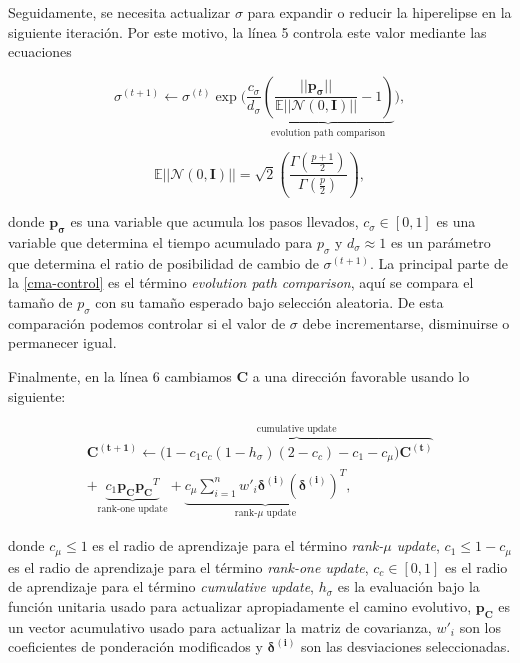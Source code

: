 Seguidamente, se necesita actualizar $\sigma$ para expandir o reducir la
hiperelipse en la siguiente iteración. Por este motivo, la línea 5 controla
este valor mediante las ecuaciones

\begin{equation}
    \sigma^{(t + 1)} \gets \sigma^{(t)} \exp\bigg(\frac{c_{\sigma}}{d_{\sigma}}
    \underbrace{\left(\frac{||\boldsymbol{p_{\sigma}}||}{\mathbb{E}||\mathcal{N}(0,
    \mathbf{I})||} - 1 \right)}_{\text{evolution path comparison}} \bigg),
\label{cma-control}
\end{equation}

\begin{equation}
\mathbb{E}||\mathcal{N}(0, \mathbf{I})|| = \sqrt{2} \left(
  \frac{\Gamma\left(\frac{p + 1}{2}\right)}{\Gamma\left({\frac{p}{2}}\right)}
  \right),
\label{cma-E}
\end{equation}

donde $\boldsymbol{p_{\sigma}}$ es una variable que acumula los pasos llevados,
$c_{\sigma} \in [0, 1]$ es una variable que determina el tiempo acumulado para $p_{\sigma}$ y 
$d_{\sigma} \approx 1$ es un parámetro que determina el ratio de posibilidad de cambio de $\sigma^{(t + 1)}$. 
La principal parte de la \autoref{cma-control} es el término \emph{evolution path comparison}, 
aquí se compara el tamaño de $p_{\sigma}$ con su tamaño esperado bajo selección
aleatoria.
De esta comparación podemos controlar si el valor de $\sigma$ debe
incrementarse, disminuirse o permanecer igual.

Finalmente, en la línea 6 cambiamos $\boldsymbol{C}$ a una dirección favorable usando lo siguiente:

\begin{multline}
  \boldsymbol{C^{(t + 1)}} \gets \overbrace{\bigg(1 - c_1 c_c (1 - h_{\sigma})(2 - c_c) - c_1 - c_{\mu}\bigg) \boldsymbol{C^{(t)}}}^{\text{cumulative update}} \\
    + \underbrace{c_{1} \boldsymbol{p_{C}} \boldsymbol{p_{C}}^{T}}_{\text{rank-one update}}
    + \underbrace{c_{\mu}\sum_{i=1}^{n}w'_{i}
    \boldsymbol{\delta^{(i)}}\left(\boldsymbol{\delta^{(i)}}\right)^{T}}_{\text{rank-}\mu\text{ update}},
\label{cma-adapt}
\end{multline}

donde $c_{\mu} \leq 1$ es el radio de aprendizaje para el término \emph{rank-$\mu$ update}, 
$c_1 \leq 1 - c_{\mu}$ es el radio de aprendizaje para el término \emph{rank-one update}, 
$c_c \in [0, 1]$ es el radio de aprendizaje para el término \emph{cumulative update}, 
$h_{\sigma}$ es la evaluación bajo la función unitaria usado para actualizar
apropiadamente el camino evolutivo, 
$\boldsymbol{p_{C}}$ es un vector acumulativo usado para actualizar la matriz de
covarianza, 
$w'_i$ son los coeficientes de ponderación modificados y
$\boldsymbol{\delta^{(i)}}$ son las desviaciones seleccionadas.


